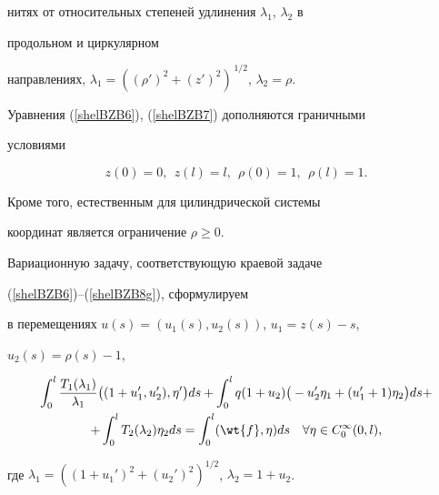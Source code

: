 нитях от относительных степеней удлинения $\lambda_1$, $\lambda_2$ в 


продольном и циркулярном


направлениях, $\lambda_1=((\rho')^2+(z')^2)^{\, 1/2}$, $\lambda_2 =\rho$.





Уравнения (\ref{shelBZB6}), (\ref{shelBZB7}) дополняются граничными


условиями


\begin{equation}


z(0)=0, \ \ z(l)=l, \ \ \rho(0)=1, \ \ \rho(l)=1.


\label{shelBZB8g}


\end{equation}


Кроме того, естественным для цилиндрической системы


координат является ограничение $\rho \geq 0$.





Вариационную задачу, соответствующую краевой задаче


(\ref{shelBZB6})--(\ref{shelBZB8g}), сформулируем


в перемещениях $u(s)=(u_1(s), u_2(s))$, $u_1=z(s)-s$,


$u_2(s) =\rho(s) -1$,


\begin{multline*}


\int_{0}^{l}\frac{T_{1}(\lambda_1)}{\lambda_1}


\big((1+u_1',u_2'), \eta' \big)ds+\int_{0}^{l}


q (1+ {u_2})\big(- u_{2}' 


\eta_{1}+({u}_{1}'+1) \eta_{2} \big)ds+\\


%


+ \int_{0}^{l}T_{2} (\lambda_2) \eta_2 ds


= \int_{0}^{l}(\wt{f}, \eta) ds


\quad \forall \eta \in C^{\infty}_{0}(0,l),




\end{multline*}


где $\lambda_1=((1+u_1')^2+(u_2')^2)^{1/2}$, $\lambda_2=1+u_2$.





